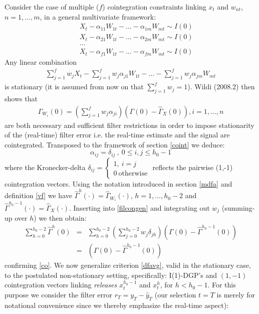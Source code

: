 \documentclass[11pt]{article}
\begin{document}
Consider the case of multiple ($f$) cointegration constraints linking $x_t$ and $w_{nt}$, $n=1,...,m$, in a general multivariate framework:
\begin{eqnarray*}
&&X_t-\alpha_{11}W_{1t}-...-\alpha_{1m}W_{mt}\sim I(0)\\
&&X_t-\alpha_{21}W_{1t}-...-\alpha_{2m}W_{mt}\sim I(0)\\
&&...\\
&&X_t-\alpha_{f1}W_{1t}-...-\alpha_{fm}W_{mt}\sim I(0)
\end{eqnarray*}
Any linear combination
\begin{eqnarray*}
\sum_{j=1}^fw_jX_t-\sum_{j=1}^fw_j\alpha_{j1}W_{1t}-...-\sum_{j=1}^fw_j\alpha_{jm}W_{mt}
\end{eqnarray*}
is stationary (it is assumed from now on that $\sum_{j=1}^fw_j=1$). Wildi (2008.2) then shows that
\begin{eqnarray}\label{filcongen}
\hat{\Gamma}_{W_i}(0)=\left(\sum_{j=1}^fw_j\alpha_{ji}\right)(\Gamma(0)-\hat{\Gamma}_X(0)), i=1,...,n
\end{eqnarray}
are both necessary and sufficient filter restrictions in order to impose stationarity of the (real-time) filter error i.e. the real-time estimate and the signal are cointegrated. Transposed to the framework of section \ref{coint} we deduce:
\[\alpha_{ij}=\delta_{ij}~,~0\leq i,j\leq h_0-1\]
where the Kronecker-delta $\delta_{ij}=\left\{\begin{array}{ll}1,~i=j\\
0~\textrm{otherwise}\end{array}\right.$ reflects the pairwise (1,-1) cointegration vectors. Using the notation introduced in section \ref{mdfa} and definition \ref{vf} we have $\hat{\Gamma}^h(\cdot)=\hat{\Gamma}_{W_i}(\cdot)$, $h=1,...,h_0-2$ and ${\hat{\Gamma}}^{h_0-1}(\cdot)=\hat{\Gamma}_X(\cdot)$. Inserting into \ref{filcongen} and integrating out $w_j$ (summing-up over $h$)  we then obtain:
\begin{eqnarray}
\sum_{h=0}^{h_0-2} \hat{\Gamma}^h(0)&=&
\sum_{h=0}^{h_0-2}\left(\sum_{j=0}^{h_0-2}w_j\delta_{jh}\right)(\Gamma(0)-{\hat{\Gamma}}^{h_0-1}(0))\\
&=&(\Gamma(0)-{\hat{\Gamma}}^{h_0-1}(0))\label{ex4}
\end{eqnarray}
confirming \ref{co}. We now generalize criterion \ref{dfavg}, valid in the stationary case, to the postulated non-stationary setting, specifically: I(1)-DGP's and $(1,-1)$ cointegration vectors linking \emph{releases} $x_t^{h_0-1}$ and $x_{t}^h$, for $h<h_0-1$. For this purpose we consider the filter error $r_T=y_T-\hat{y}_T$ (our selection $t=T$ is merely for notational convenience since we thereby emphasize the real-time aspect):
\end{document}
